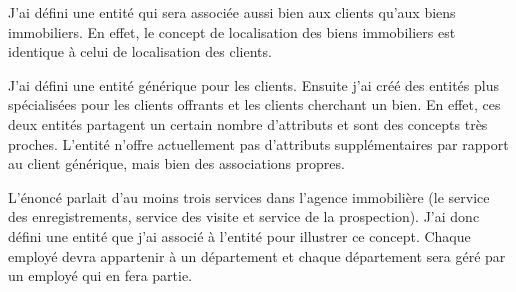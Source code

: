 J'ai défini une entité  qui sera associée aussi bien aux clients qu'aux biens immobiliers. En effet, le concept de localisation des biens immobiliers est identique à celui de localisation des clients.

J'ai défini une entité générique pour les clients. Ensuite j'ai créé des entités plus spécialisées pour les clients offrants et les clients cherchant un bien. En effet, ces deux entités partagent un certain nombre d'attributs et sont des concepts très proches.  L'entité  n'offre actuellement pas d'attributs supplémentaires par rapport au client générique, mais bien des associations propres.

L'énoncé parlait d'au moins trois services dans l'agence immobilière (le service des enregistrements, service des visite et service de la prospection). J'ai donc défini une entité  que j'ai associé à l'entité  pour illustrer ce concept. Chaque employé devra appartenir à un département et chaque département sera géré par un employé qui en fera partie.